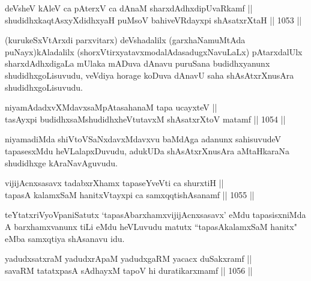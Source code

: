 
\begin{shl}
deVsheV kAleV ca pAterxV ca dAnaM sharxdAdhxdipUvaRkamf || \\
shudidhxkaqtAsxyXdidhxyaH puMsoV bahiveVRdayxpi shAsatxrXtaH \hfill || 1053 ||  
\end{shl}

\begin{artha}
(kurukeSxVtArxdi parxvitarx) deVshadalilx (garxhaNamuMtAda puNayx)\break kAladalilx (shorxVtirxyatavxmodalAdasadugxNavuLaLx) pAtarxdalUlx sharxdAdhxdigaLa mUlaka mADuva dAnavu puruSana budidhxyanunx shudidhxgoLisuvudu, veVdiya horage koDuva dAnavU saha shAsAtxrXnusAra shudidhxgoLisuvudu.
\end{artha}


\begin{shl}
niyamAdadxvXMdavxsaMpAtasahanaM tapa ucayxteV || \\
tasAyxpi budidhxsaMshudidhxheVtutavxM shAsatxrXtoV matamf \hfill || 1054 ||  
\end{shl}

\begin{artha}
niyamadiMda shiVtoVSaNxdavxMdavxvu baMdAga adanunx sahisuvudeV tapasesxMdu heVLalapxDuvudu, adukUDa shAsAtxrXnusAra aMtaHkaraNa shudidhxge kAraNavAguvudu.
\end{artha}

\begin{shl}
vijijAcnxsasavx tadabxrXhamx tapaseYveVti ca shurxtiH || \\
tapasA kalamxSaM hanitxVtayxpi ca samxqqtishAsanamf \hfill || 1055 ||  
\end{shl}

\begin{artha}
teYtatxriVyoVpaniSatutx `tapasAbarxhamxvijijAcnxsasavx' eMdu tapasisxniMda A barxhamxvanunx tiLi eMdu heVLuvudu matutx ``tapasAkalamxSaM hanitx" eMba samxqtiya shAsanavu idu.
\end{artha}


\begin{shl}
yadudxsatxraM yadudxrApaM yadudxgaRM yacacx duSakxramf || \\
savaRM tatatxpasA sAdhayxM tapoV hi duratikarxmamf \hfill || 1056 ||  
\end{shl}

